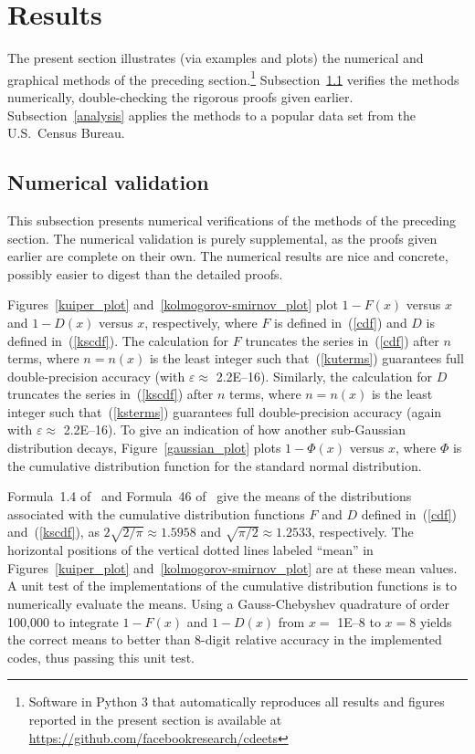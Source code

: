 \documentclass[12pt]{article}
\def\epsilon{\varepsilon}
\begin{document}
\section{Results}
\label{results}

The present section illustrates (via examples and plots)
the numerical and graphical methods of the preceding section.\footnote{Software
in Python 3 that automatically reproduces all results and figures reported
in the present section is available
at \url{https://github.com/facebookresearch/cdeets}}
Subsection~\ref{validation} verifies the methods numerically,
double-checking the rigorous proofs given earlier.
Subsection~\ref{analysis} applies the methods to a popular data set
from the U.S.\ Census Bureau.



\subsection{Numerical validation}
\label{validation}

This subsection presents numerical verifications of the methods
of the preceding section. The numerical validation is purely supplemental,
as the proofs given earlier are complete on their own. The numerical results
are nice and concrete, possibly easier to digest than the detailed proofs.

Figures~\ref{kuiper_plot} and~\ref{kolmogorov-smirnov_plot}
plot $1 - F(x)$ versus $x$ and $1 - D(x)$ versus $x$,
respectively, where $F$ is defined in~(\ref{cdf})
and $D$ is defined in~(\ref{kscdf}).
The calculation for $F$ truncates the series in~(\ref{cdf}) after $n$ terms,
where $n = n(x)$ is the least integer such that~(\ref{kuterms})
guarantees full double-precision accuracy (with $\epsilon \approx$ 2.2E--16).
Similarly, the calculation for $D$ truncates the series in~(\ref{kscdf})
after $n$ terms, where $n = n(x)$ is the least integer
such that~(\ref{ksterms}) guarantees full double-precision accuracy
(again with $\epsilon \approx$ 2.2E--16).
To give an indication of how another sub-Gaussian distribution decays,
Figure~\ref{gaussian_plot} plots $1 - \Phi(x)$ versus $x$,
where $\Phi$ is the cumulative distribution function
for the standard normal distribution.

Formula~1.4 of~\citet{feller} and Formula~46 of~\citet{masoliver} give
the means of the distributions associated
with the cumulative distribution functions
$F$ and $D$ defined in~(\ref{cdf}) and~(\ref{kscdf}),
as $2 \sqrt{2/\pi} \approx 1.5958$
and $\sqrt{\pi/2} \approx 1.2533$, respectively.
The horizontal positions of the vertical dotted lines labeled ``mean''
in Figures~\ref{kuiper_plot} and~\ref{kolmogorov-smirnov_plot}
are at these mean values.
A unit test of the implementations of the cumulative distribution functions
is to numerically evaluate the means.
Using a Gauss-Chebyshev quadrature of order 100,000 to integrate
$1 - F(x)$ and $1 - D(x)$ from $x =$ 1E--8 to $x = 8$
yields the correct means to better than 8-digit relative accuracy
in the implemented codes, thus passing this unit test.
\end{document}
